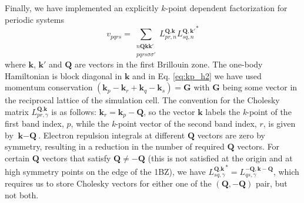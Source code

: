 Finally, we have implemented an explicitly $k$-point dependent factorization for periodic systems\cite{MottaKPoint2019,MaloneGPU2020}
\begin{equation}
    v_{pqrs} = \sum_{\substack{n\textbf{Q}\textbf{k}\textbf{k}' \\ pqrs\sigma\sigma'}} L^{\textbf{Q},\textbf{k}}_{pr,n} {L^{\textbf{Q},\textbf{k}'}_{sq,n}}^{*}\label{eq:kp_h2}
\end{equation}
where $\textbf{k}$, $\textbf{k}'$ and $\textbf{Q}$ are vectors in the first Brillouin zone.
The one-body Hamiltonian is block diagonal in $\textbf{k}$ and in Eq. \ref{eq:kp_h2} we have used momentum conservation $(\textbf{k}_p - \textbf{k}_r + \textbf{k}_q - \textbf{k}_s) = \textbf{G}$ with $\textbf{G}$ being some vector in the reciprocal lattice of the simulation cell.
The convention for the Cholesky matrix $L^{\textbf{Q},\textbf{k}}_{pr,\gamma}$ is as follows: $\textbf{k}_r = \textbf{k}_p - \textbf{Q}$, so the vector $\textbf{k}$ labels the \textit{k}-point of the first band index, $\textit{p}$, while the \textit{k}-point vector of the second band index, $\textit{r}$, is given by $\textbf{k} - \textbf{Q}$.  Electron repulsion integrals at different $\textbf{Q}$ vectors are zero by symmetry, resulting in a reduction in the number of required $\mathbf{Q}$ vectors.
For certain $\textbf{Q}$ vectors that satisfy $\textbf{Q} \ne -\textbf{Q}$ (this is not satisfied at the origin and at high symmetry points on the edge of the 1BZ), we have ${L^{\textbf{Q},\textbf{k}}_{sq,\gamma}}^{*} = {L^{-\textbf{Q},\textbf{k}-\textbf{Q}}_{qs,\gamma}}$, which requires us to store Cholesky vectors for either one of the $(\textbf{Q},-\textbf{Q})$ pair, but not both.

